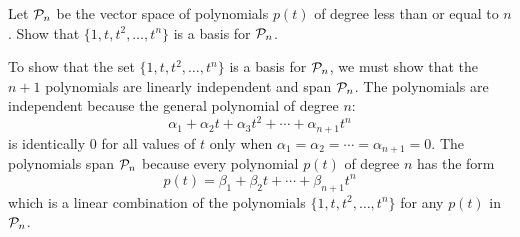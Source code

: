 \documentclass{ximera}
\begin{document}
\begin{exercise}  \label{c7.2.2}
Let ${\cal P}_n$ be the vector space of polynomials $p(t)$ of
degree less than or equal to $n$.  Show that $\{1,t,t^2,\ldots,t^n\}$ is a
basis for ${\cal P}_n$.

\begin{solution}
\soln
To show that the set $\{1,t,t^2,\dots,t^n\}$ is a basis for
${\cal P}_n$, we must show that the $n + 1$ polynomials are
linearly independent and span ${\cal P}_n$.  The polynomials are
independent because the general polynomial of degree $n$:
\[
\alpha_1 + \alpha_2t + \alpha_3t^2 + \cdots + \alpha_{n+1}t^n
\]
is identically $0$ for all values of $t$ only when $\alpha_1 =
\alpha_2 = \cdots = \alpha_{n + 1} = 0$.  The polynomials span
${\cal P}_n$ because every polynomial $p(t)$ of degree $n$ has
the form
\[ p(t) = \beta_1 + \beta_2t + \cdots + \beta_{n + 1}t^n \]
which is a linear combination of the polynomials
$\{1,t,t^2,\dots,t^n\}$ for any $p(t)$ in ${\cal P}_n$.

\end{solution}
\end{exercise}
\end{document}
